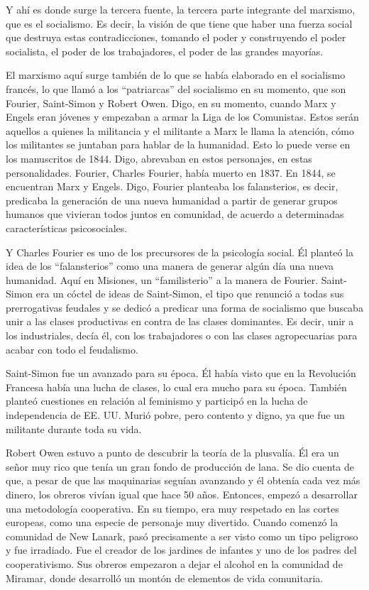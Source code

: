 \documentclass[
  a4paper,
]{article}
\begin{document}
Y ahí es donde surge la tercera fuente, la tercera parte integrante del
marxismo, que es el socialismo. Es decir, la visión de que tiene que
haber una fuerza social que destruya estas contradicciones, tomando el
poder y construyendo el poder socialista, el poder de los trabajadores,
el poder de las grandes mayorías.

El marxismo aquí surge también de lo que se había elaborado en el
socialismo francés, lo que llamó a los ``patriarcas'' del socialismo en
su momento, que son Fourier, Saint-Simon y Robert Owen. Digo, en su
momento, cuando Marx y Engels eran jóvenes y empezaban a armar la Liga
de los Comunistas. Estos serán aquellos a quienes la militancia y el
militante a Marx le llama la atención, cómo los militantes se juntaban
para hablar de la humanidad. Esto lo puede verse en los manuscritos de
1844. Digo, abrevaban en estos personajes, en estas personalidades.
Fourier, Charles Fourier, había muerto en 1837. En 1844, se encuentran
Marx y Engels. Digo, Fourier planteaba los falansterios, es decir,
predicaba la generación de una nueva humanidad a partir de generar
grupos humanos que vivieran todos juntos en comunidad, de acuerdo a
determinadas características psicosociales.

Y Charles Fourier es uno de los precursores de la psicología social. Él
planteó la idea de los ``falansterios'' como una manera de generar algún
día una nueva humanidad. Aquí en Misiones, un ``familisterio'' a la
manera de Fourier. Saint-Simon era un cóctel de ideas de Saint-Simon, el
tipo que renunció a todas sus prerrogativas feudales y se dedicó a
predicar una forma de socialismo que buscaba unir a las clases
productivas en contra de las clases dominantes. Es decir, unir a los
industriales, decía él, con los trabajadores o con las clases
agropecuarias para acabar con todo el feudalismo.

Saint-Simon fue un avanzado para su época. Él había visto que en la
Revolución Francesa había una lucha de clases, lo cual era mucho para su
época. También planteó cuestiones en relación al feminismo y participó
en la lucha de independencia de EE. UU. Murió pobre, pero contento y
digno, ya que fue un militante durante toda su vida.

Robert Owen estuvo a punto de descubrir la teoría de la plusvalía. Él
era un señor muy rico que tenía un gran fondo de producción de lana. Se
dio cuenta de que, a pesar de que las maquinarias seguían avanzando y él
obtenía cada vez más dinero, los obreros vivían igual que hace 50 años.
Entonces, empezó a desarrollar una metodología cooperativa. En su
tiempo, era muy respetado en las cortes europeas, como una especie de
personaje muy divertido. Cuando comenzó la comunidad de New Lanark, pasó
precisamente a ser visto como un tipo peligroso y fue irradiado. Fue el
creador de los jardines de infantes y uno de los padres del
cooperativismo. Sus obreros empezaron a dejar el alcohol en la comunidad
de Miramar, donde desarrolló un montón de elementos de vida comunitaria.
\end{document}
